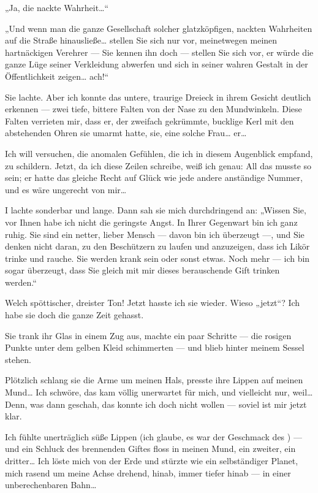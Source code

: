 „Ja, die nackte Wahrheit\ldots{}“

„Und wenn man die ganze Gesellschaft solcher glatzköpfigen, nackten
Wahrheiten auf die Straße hinausließe\ldots{} stellen Sie sich nur vor,
meinetwegen meinen hartnäckigen Verehrer — Sie kennen ihn doch —
stellen Sie sich vor, er würde die ganze Lüge seiner Verkleidung
abwerfen und sich in seiner wahren Gestalt in der Öffentlichkeit
zeigen\ldots{} ach!“

Sie lachte. Aber ich konnte das untere, traurige Dreieck in ihrem
Gesicht deutlich erkennen — zwei tiefe, bittere Falten von der Nase
zu den Mundwinkeln. Diese Falten verrieten mir, dass er, der
zweifach gekrümmte, bucklige Kerl mit den abstehenden Ohren sie
umarmt hatte, sie, eine solche Frau\ldots{} er\ldots{}

Ich will versuchen, die anomalen Gefühlen, die ich in diesem
Augenblick empfand, zu schildern. Jetzt, da ich diese Zeilen
schreibe, weiß ich genau: All das musste so sein; er hatte das
gleiche Recht auf Glück wie jede andere anständige Nummer, und es
wäre ungerecht von mir\ldots{}

I lachte sonderbar und lange. Dann sah
sie mich durchdringend an: „Wissen Sie, vor Ihnen habe ich nicht
die geringste Angst. In Ihrer Gegenwart bin ich ganz ruhig. Sie
sind ein netter, lieber Mensch — davon bin ich überzeugt —, und Sie
denken nicht daran, zu den Beschützern zu laufen und anzuzeigen,
dass ich Likör trinke und rauche. Sie werden krank sein oder sonst
etwas. Noch mehr — ich bin sogar überzeugt, dass Sie gleich mit mir
dieses berauschende Gift trinken werden.“

Welch spöttischer,
dreister Ton! Jetzt hasste ich sie wieder. Wieso „jetzt“? Ich habe
sie doch die ganze Zeit gehasst.

Sie trank ihr Glas in einem Zug
aus, machte ein paar Schritte — die rosigen Punkte unter dem gelben
Kleid schimmerten — und blieb hinter meinem Sessel stehen.

Plötzlich schlang sie die Arme um meinen Hals, presste ihre Lippen
auf meinen Mund\ldots{} Ich schwöre, das kam völlig unerwartet für mich,
und vielleicht nur, weil\ldots{} Denn, was dann geschah, das konnte ich
doch nicht wollen — soviel ist mir jetzt klar.

Ich fühlte unerträglich süße Lippen (ich glaube, es war der
Geschmack des ) — und ein Schluck des brennenden Giftes floss
in meinen Mund, ein zweiter, ein dritter\ldots{} Ich löste mich von der
Erde und stürzte wie ein selbständiger Planet, mich rasend um meine
Achse drehend, hinab, immer tiefer hinab — in einer unberechenbaren
Bahn\ldots{}

